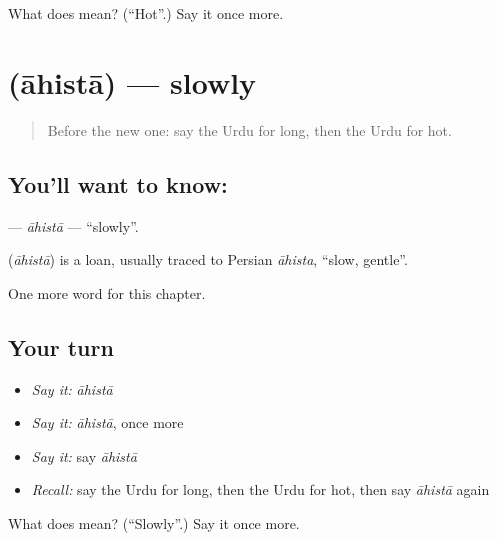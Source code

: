 \begin{tcolorbox}[breakable,colback=teal!4,colframe=teal!35!black,title={Before you move on}]
What does  mean? (\textquotedblleft{}Hot\textquotedblright{}.) Say it once more.
\end{tcolorbox}
\section[\texorpdfstring{\ur{آہستہ} (āhistā)}{آہستہ (āhistā)}]{ (āhistā) — slowly}

\label{lesson:UR-C71-ahista}



\begin{quote}
Before the new one: say the Urdu for long, then the Urdu for hot.
\end{quote}

\subsection*{You'll want to know: }
\textbf{} — \emph{āhistā} — \textquotedblleft{}slowly\textquotedblright{}.

\begin{cousinweb}
\textbf{} (\emph{āhistā}) is a loan, usually traced to Persian \emph{āhista}, \textquotedblleft{}slow, gentle\textquotedblright{}.
\end{cousinweb}

\begin{grammarlens}[title={What you've built}]
One more word for this chapter.
\end{grammarlens}

\subsection*{Your turn}
\begin{itemize}
\raggedright
  \item \emph{Say it:} \emph{āhistā}
  \item \emph{Say it:} \emph{āhistā}, once more
  \item \emph{Say it:} say \emph{āhistā}
  \item \emph{Recall:} say the Urdu for long, then the Urdu for hot, then say \emph{āhistā} again
\end{itemize}

\begin{tcolorbox}[breakable,colback=teal!4,colframe=teal!35!black,title={Before you move on}]
What does  mean? (\textquotedblleft{}Slowly\textquotedblright{}.) Say it once more.
\end{tcolorbox}
